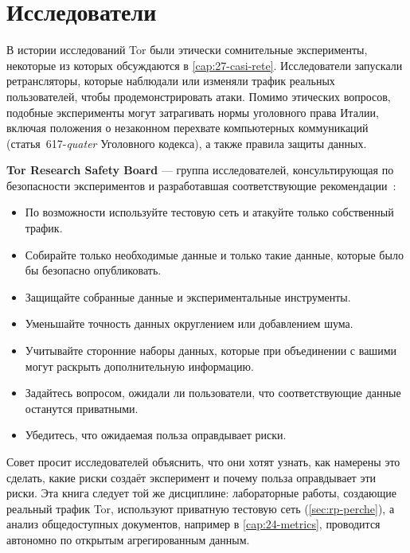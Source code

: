 \section{Исследователи}\label{sec:legale-ricerca}

В истории исследований Tor были этически сомнительные эксперименты, некоторые из которых обсуждаются в \cref{cap:27-casi-rete}. Исследователи запускали ретрансляторы, которые наблюдали или изменяли трафик реальных пользователей, чтобы продемонстрировать атаки. Помимо этических вопросов, подобные эксперименты могут затрагивать нормы уголовного права Италии, включая положения о незаконном перехвате компьютерных коммуникаций (статья~617-\emph{quater} Уголовного кодекса), а также правила защиты данных.

\textbf{Tor Research Safety Board} — группа исследователей, консультирующая по безопасности экспериментов и разработавшая соответствующие рекомендации~\cite{trsb}:
\begin{itemize}
  \item По возможности используйте тестовую сеть и атакуйте только собственный трафик.
  \item Собирайте только необходимые данные и только такие данные, которые было бы безопасно опубликовать.
  \item Защищайте собранные данные и экспериментальные инструменты.
  \item Уменьшайте точность данных округлением или добавлением шума.
  \item Учитывайте сторонние наборы данных, которые при объединении с вашими могут раскрыть дополнительную информацию.
  \item Задайтесь вопросом, ожидали ли пользователи, что соответствующие данные останутся приватными.
  \item Убедитесь, что ожидаемая польза оправдывает риски.
\end{itemize}
Совет просит исследователей объяснить, что они хотят узнать, как намерены это сделать, какие риски создаёт эксперимент и почему польза оправдывает эти риски. Эта книга следует той же дисциплине: лабораторные работы, создающие реальный трафик Tor, используют приватную тестовую сеть (\cref{sec:rp-perche}), а анализ общедоступных документов, например в \cref{cap:24-metrics}, проводится автономно по открытым агрегированным данным.

